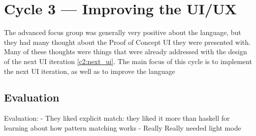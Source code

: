 \chapter{Cycle 3 --- Improving the UI/UX}
The advanced focus group was generally very positive about the language, but they had many thought about the Proof of Concept UI they were presented with. Many of these thoughts were things that were already addressed with the design of the next UI iteration \ref{c2:next_ui}. The main focus of this cycle is to implement the next UI iteration, as well as to improve the language


\section{Evaluation}
\label{eval:IFG}
Evaluation:
- They liked explicit match: they liked it more than haskell for learning about how pattern matching works
- Really Really needed light mode